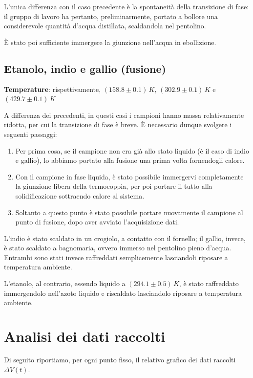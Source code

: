 \documentclass{article}
\begin{document}
L'unica differenza con il caso precedente è la spontaneità
della transizione di fase:
il gruppo di lavoro ha pertanto, preliminarmente, portato
a bollore una considerevole quantità d'acqua distillata,
scaldandola nel pentolino.

È stato poi sufficiente immergere la giunzione nell'acqua
in ebollizione.

\pagebreak
\subsection*{Etanolo, indio e gallio (fusione)}
\textbf{Temperature}: rispettivamente, $(158.8\pm0.1)\,\unit{K}$,
$(302.9\pm0.1)\,\unit{K}$ e $(429.7\pm0.1)\,\unit{K}$
\vspace{1mm}

A differenza dei precedenti, in questi casi i campioni
hanno massa relativamente ridotta, per cui la transizione
di fase è breve. È necessario dunque svolgere i seguenti passaggi:
\begin{enumerate}
  \item
    Per prima cosa, se il campione non era già allo stato liquido
    (è il caso di indio e gallio), lo abbiamo portato alla fusione
    una prima volta fornendogli calore.
  \item
    Con il campione in fase liquida, è stato possibile immergervi
    completamente la giunzione libera della termocoppia, per poi
    portare il tutto alla solidificazione sottraendo calore al
    sistema.
  \item
    Soltanto a questo punto è stato possibile portare nuovamente
    il campione al punto di fusione, dopo aver avviato l'acquisizione
    dati.
\end{enumerate}
L'indio è stato scaldato in un crogiolo, a contatto con il
fornello; il gallio, invece, è stato scaldato a bagnomaria,
ovvero immerso nel pentolino pieno d'acqua.
Entrambi sono stati invece raffreddati semplicemente
lasciandoli riposare a temperatura ambiente.

L'etanolo, al contrario, essendo liquido a $(294.1\pm0.5)\,\unit{K}$,
è stato raffreddato immergendolo nell'azoto liquido e riscaldato
lasciandolo riposare a temperatura ambiente.


\section{Analisi dei dati raccolti}
Di seguito riportiamo, per ogni punto fisso, il relativo
grafico dei dati raccolti $\Delta V(t)$.
\end{document}
